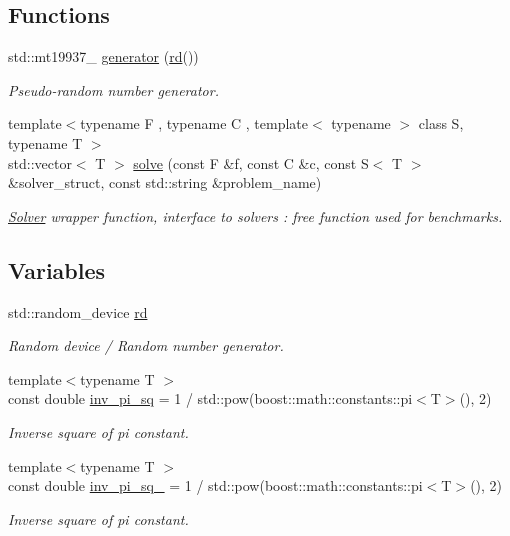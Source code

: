 \subsection*{Functions}
\begin{DoxyCompactItemize}
\item 
std\+::mt19937\+\_ \hyperlink{namespaceea_a385e8ca8ba4ae2f69dcfffa79f20c2ff}{generator} (\hyperlink{namespaceea_a0d4adcfbf42f88a74097673d4564f757}{rd}())
\begin{DoxyCompactList}\small\item\em Pseudo-\/random number generator. \end{DoxyCompactList}\item 
{\footnotesize template$<$typename F , typename C , template$<$ typename $>$ class S, typename T $>$ }\\std\+::vector$<$ T $>$ \hyperlink{namespaceea_a6450b5bf61e9fdca8b6c19267e14c560}{solve} (const F \&f, const C \&c, const S$<$ T $>$ \&solver\+\_\+struct, const std\+::string \&problem\+\_\+name)
\begin{DoxyCompactList}\small\item\em \hyperlink{classea_1_1_solver}{Solver} wrapper function, interface to solvers \+: free function used for benchmarks. \end{DoxyCompactList}\end{DoxyCompactItemize}
\subsection*{Variables}
\begin{DoxyCompactItemize}
\item 
std\+::random\+\_\+device \hyperlink{namespaceea_a0d4adcfbf42f88a74097673d4564f757}{rd}
\begin{DoxyCompactList}\small\item\em Random device / Random number generator. \end{DoxyCompactList}\item 
{\footnotesize template$<$typename T $>$ }\\const double \hyperlink{namespaceea_a0a68157259a48341f23eeffca8a1d748}{inv\+\_\+pi\+\_\+sq} = 1 / std\+::pow(boost\+::math\+::constants\+::pi$<$T$>$(), 2)
\begin{DoxyCompactList}\small\item\em Inverse square of pi constant. \end{DoxyCompactList}\item 
{\footnotesize template$<$typename T $>$ }\\const double \hyperlink{namespaceea_aceb1a704bbda5c44541cd98184c2c224}{inv\+\_\+pi\+\_\+sq\+\_} = 1 / std\+::pow(boost\+::math\+::constants\+::pi$<$T$>$(), 2)
\begin{DoxyCompactList}\small\item\em Inverse square of pi constant. \end{DoxyCompactList}\end{DoxyCompactItemize}


